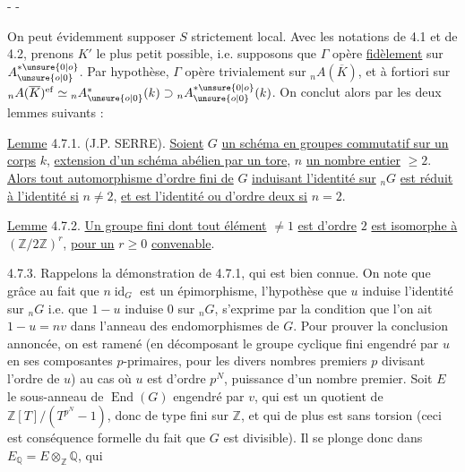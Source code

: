 \begin{center}-  -\end{center}

On peut évidemment supposer $S$ strictement local. Avec les notations de 4.1 et de 4.2, prenons $K'$ le plus petit possible, i.e. supposons que $\Gamma$ opère \uline{fidèlement} sur $A_{\unsure{o|0}}^{*\unsure{0|o}}$. Par hypothèse, $\Gamma$ opère trivialement sur ${}_nA(\overline K)$, et à fortiori sur ${}_nA(\overline K)^{\mathrm{ef}}\simeq{}_nA_{\unsure{o|0}}^*(k)\supset{}_nA_{\unsure{o|0}}^{*\unsure{0|o}}(k)$. On conclut alors par les deux lemmes suivants :

\uline{Lemme} 4.7.1. (J.P. SERRE). \uline{Soient} $G$ \uline{un schéma en groupes commutatif sur un corps} $k$, \uline{extension d'un schéma abélien par un tore}, $n$ \uline{un nombre entier} $\geq2$. \uline{Alors tout automorphisme d'ordre fini de} $G$ \uline{induisant l'identité sur} ${}_nG$ \uline{est réduit à l'identité si} $n\neq2$, \uline{et est l'identité ou d'ordre deux si} $n=2$.

\uline{Lemme} 4.7.2. \uline{Un groupe fini dont tout élément} $\neq1$ \uline{est d'ordre} $2$ \uline{est isomorphe à} $(\mathbb Z/2\mathbb Z)^r$, \uline{pour un} $r\geq0$ \uline{convenable}.

4.7.3. Rappelons la démonstration de 4.7.1, qui est bien connue. On note que grâce au fait que $n\operatorname{id}_G$ est un épimorphisme, l'hypothèse que $u$ induise l'identité sur ${}_nG$ i.e. que $1-u$ induise $0$ sur ${}_nG$, s'exprime par la condition que l'on ait $1-u=nv$ dans l'anneau des endomorphismes de $G$. Pour prouver la conclusion annoncée, on est ramené (en décomposant le groupe cyclique fini engendré par $u$ en ses composantes $p$-primaires, pour les divers nombres premiers $p$ divisant l'ordre de $u$) au cas où $u$ est d'ordre $p^N$, puissance d'un nombre premier. Soit $E$ le sous-anneau de $\operatorname{End}(G)$ engendré par $v$, qui est un quotient de $\mathbb Z[T]/(T^{p^N}-1)$, donc de type fini sur $\mathbb Z$, et qui de plus est sans torsion (ceci est conséquence formelle du fait que $G$ est divisible). Il se plonge donc dans $E_{\mathbb Q}=E\otimes_{\mathbb Z}\mathbb Q$, qui
